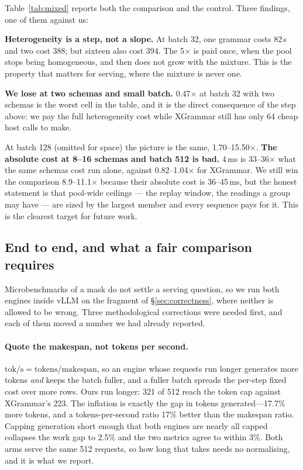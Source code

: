\documentclass{article}
\begin{document}
Table~\ref{tab:mixed} reports both the comparison and the control. Three
findings, one of them against us:

\textbf{Heterogeneity is a step, not a slope.} At batch 32, one grammar costs
82\,\textmu{}s and two cost 388; but sixteen also cost 394. The 5$\times$ is paid
once, when the pool stops being homogeneous, and then does not grow with the
mixture. This is the property that matters for serving, where the mixture is
never one.

\textbf{We lose at two schemas and small batch.} 0.47$\times$ at batch 32 with
two schemas is the worst cell in the table, and it is the direct consequence of
the step above: we pay the full heterogeneity cost while XGrammar still has only
64 cheap host calls to make.

At batch 128 (omitted for space) the picture is the same, 1.70--15.50$\times$.
\textbf{The absolute cost at 8--16 schemas and batch 512 is bad.} 4\,ms is
33--36$\times$ what the same schemas cost run alone, against 0.82--1.04$\times$
for XGrammar. We still win the comparison 8.9--11.1$\times$ because their
absolute cost is 36--45\,ms, but the honest statement is that pool-wide ceilings
--- the replay window, the readings a group may have --- are sized by the
largest member and every sequence pays for it. This is the clearest target for
future work.

\subsection{End to end, and what a fair comparison requires}
\label{sec:eval-e2e}

Microbenchmarks of a mask do not settle a serving question, so we run both
engines inside vLLM on the fragment of \S\ref{sec:correctness}, where neither
is allowed to be wrong. Three methodological corrections were needed first, and
each of them moved a number we had already reported.

\paragraph{Quote the makespan, not tokens per second.}
$\text{tok/s} = \text{tokens}/\text{makespan}$, so an engine whose requests run
longer generates more tokens \emph{and} keeps the batch fuller, and a fuller
batch spreads the per-step fixed cost over more rows. Ours run longer: 321 of
512 reach the token cap against XGrammar's 223. The inflation is exactly the
gap in tokens generated---17.7\% more tokens, and a tokens-per-second ratio
17\% better than the makespan ratio. Capping generation short enough that both
engines are nearly all capped collapses the work gap to 2.5\% and the two
metrics agree to within 3\%. Both arms serve the same 512 requests, so how long
that takes needs no normalising, and it is what we report.
\end{document}
